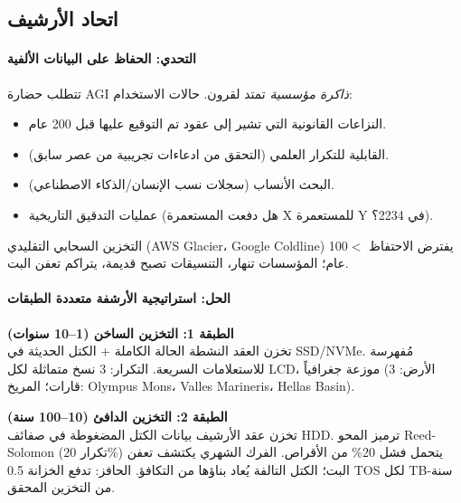\documentclass[11pt]{article}
\begin{document}
\subsection{اتحاد الأرشيف}

\paragraph{التحدي: الحفاظ على البيانات الألفية}
تتطلب حضارة AGI \emph{ذاكرة مؤسسية} تمتد لقرون. حالات الاستخدام:
\begin{itemize}[noitemsep]
  \item النزاعات القانونية التي تشير إلى عقود تم التوقيع عليها قبل 200 عام.
  \item القابلية للتكرار العلمي (التحقق من ادعاءات تجريبية من عصر سابق).
  \item البحث الأنساب (سجلات نسب الإنسان/الذكاء الاصطناعي).
  \item عمليات التدقيق التاريخية (هل دفعت المستعمرة X للمستعمرة Y في 2234؟).
\end{itemize}
التخزين السحابي التقليدي (AWS Glacier، Google Coldline) يفترض الاحتفاظ $<$100 عام؛ المؤسسات تنهار، التنسيقات تصبح قديمة، يتراكم تعفن البت.

\paragraph{الحل: استراتيجية الأرشفة متعددة الطبقات}

\textbf{الطبقة 1: التخزين الساخن (1--10 سنوات)}\\
تخزن العقد النشطة الحالة الكاملة + الكتل الحديثة في SSD/NVMe. مُفهرسة للاستعلامات السريعة. التكرار: 3 نسخ متماثلة لكل LCD، موزعة جغرافياً (الأرض: 3 قارات؛ المريخ: Olympus Mons، Valles Marineris، Hellas Basin).

\textbf{الطبقة 2: التخزين الدافئ (10--100 سنة)}\\
تخزن عقد الأرشيف بيانات الكتل المضغوطة في صفائف HDD. ترميز المحو Reed-Solomon (تكرار 20\%) يتحمل فشل 20\% من الأقراص. الفرك الشهري يكتشف تعفن البت؛ الكتل التالفة يُعاد بناؤها من التكافؤ. الحافز: تدفع الخزانة 0.5 TOS لكل TB-سنة من التخزين المحقق.
\end{document}
